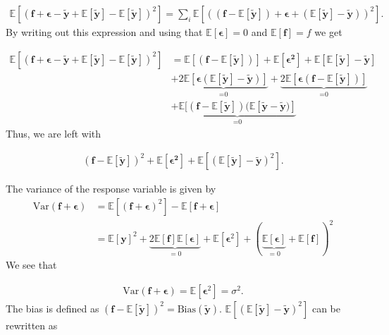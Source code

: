 \begin{align}
    \mathbb{E}\left[(\mathbf{f}+\mathbf{\epsilon}-\mathbf{\tilde{y}}+\mathbb{E}[\mathbf{\tilde{y}}]-\mathbb{E}[\mathbf{\tilde{y}}])^2\right] = \sum_{i}\mathbb{E}\left[((\mathbf{f}-\mathbb{E}[\mathbf{\tilde{y}}])+\mathbf{\epsilon}+(\mathbb{E}[\mathbf{\tilde{y}}]-\mathbf{\tilde{y}}))^2\right]. 
\end{align} By writing out this expression and using that \ensuremath{\mathbb{E}[\mathbf{\epsilon}]=0} and \ensuremath{\mathbb{E}[\mathbf{f}]=f} we get

\begin{align*}
    \mathbb{E}\left[(\mathbf{f}+\mathbf{\epsilon}-\mathbf{\tilde{y}}+\mathbb{E}[\mathbf{\tilde{y}}]-\mathbb{E}[\mathbf{\tilde{y}}])^2\right] &= 
    \mathbb{E}[(\mathbf{f}-\mathbb{E}[\mathbf{\tilde{y}}])]+\mathbb{E}[\mathbf{\epsilon^2}]+\mathbb{E}[\mathbb{E}[\mathbf{\tilde{y}}]-\mathbf{\tilde{y}}]\\&+\underbrace{2\mathbb{E}[\boldsymbol{\epsilon}(\mathbb{E}[\mathbf{\tilde{y}}]-\mathbf{\tilde{y}})]}_{\text{=0}}+\underbrace{2\mathbb{E}[\boldsymbol{\epsilon}(\mathbf{f}-\mathbb{E}[\mathbf{\tilde{y}}])]}_{\text{=0}}\\&+\underbrace{\mathbb{E}[(\mathbf{f}-\mathbb{E}[\mathbf{\tilde{y}}])(\mathbb{E}[\mathbf{\tilde{y}}-\mathbf{\tilde{y}})]}_{\text{=0}}
\end{align*} Thus, we are left with 

\begin{align*}
    (\mathbf{f}-\mathbb{E}[\mathbf{\tilde{y}}])^2+\mathbb{E}[\boldsymbol{\epsilon^2}]+\mathbb{E}[(\mathbb{E}[\mathbf{\tilde{y}}]-\mathbf{\tilde{y}})^2].
\end{align*}

The variance of the response variable is given by
\begin{align*}
    \mathrm{Var}(\mathbf{f}+\boldsymbol{\epsilon})&=\mathbb{E}[(\mathbf{f}+\boldsymbol{\epsilon})^2]-\mathbb{E}[\mathbf{f}+\boldsymbol{\epsilon}]\\&=\mathbb{E}[\mathbf{y}]^2+\underbrace{2\mathbb{E}[\mathbf{f}]\mathbb{E}[\boldsymbol{\epsilon}]}_{=0}+\mathbb{E}[\boldsymbol{\epsilon}^2]+(\underbrace{\mathbb{E}[\boldsymbol{\epsilon}]}_{=0}+\mathbb{E}[\mathbf{f}])^2
\end{align*} We see that 

\begin{align*}
    \mathrm{Var}(\mathbf{f}+\boldsymbol{\epsilon})=\mathbb{E}[\boldsymbol{\epsilon}^2]=\sigma^2.
\end{align*} The bias is defined as \ensuremath{(\mathbf{f}-\mathbb{E}[\mathbf{\tilde{y}}])^2=\mathrm{Bias}(\mathbf{\tilde{y}})}. \ensuremath{\mathbb{E}[(\mathbb{E}[\mathbf{\tilde{y}}]-\mathbf{\tilde{y}})^2]} can be rewritten as

